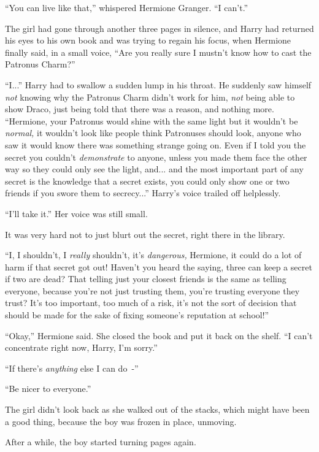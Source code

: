 ``You can live like that,'' whispered Hermione Granger. ``I can't.''

The girl had gone through another three pages in silence, and Harry had returned his eyes to his own book and was trying to regain his focus, when Hermione finally said, in a small voice, ``Are you really sure I mustn't know how to cast the Patronus Charm?''

``I...'' Harry had to swallow a sudden lump in his throat. He suddenly saw himself \emph{not} knowing why the Patronus Charm didn't work for him, \emph{not} being able to show Draco, just being told that there was a reason, and nothing more. ``Hermione, your Patronus would shine with the same light but it wouldn't be \emph{normal,} it wouldn't look like people think Patronuses should look, anyone who saw it would know there was something strange going on. Even if I told you the secret you couldn't \emph{demonstrate} to anyone, unless you made them face the other way so they could only see the light, and... and the most important part of any secret is the knowledge that a secret exists, you could only show one or two friends if you swore them to secrecy...'' Harry's voice trailed off helplessly.

``I'll take it.'' Her voice was still small.

It was very hard not to just blurt out the secret, right there in the library.

``I, I shouldn't, I \emph{really} shouldn't, it's \emph{dangerous,} Hermione, it could do a lot of harm if that secret got out! Haven't you heard the saying, three can keep a secret if two are dead? That telling just your closest friends is the same as telling everyone, because you're not just trusting them, you're trusting everyone they trust? It's too important, too much of a risk, it's not the sort of decision that should be made for the sake of fixing someone's reputation at school!''

``Okay,'' Hermione said. She closed the book and put it back on the shelf. ``I can't concentrate right now, Harry, I'm sorry.''

``If there's \emph{anything} else I can do~-''

``Be nicer to everyone.''

The girl didn't look back as she walked out of the stacks, which might have been a good thing, because the boy was frozen in place, unmoving.

After a while, the boy started turning pages again.
